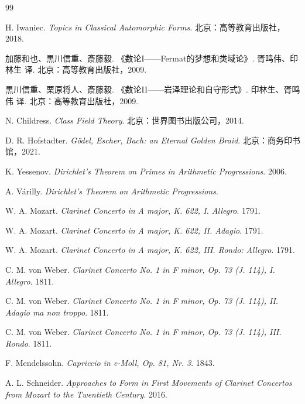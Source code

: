 
\color{black}
\pagecolor{white}
\begin{thebibliography}{99}

H. Iwaniec.
\textit{Topics in Classical Automorphic Forms}.
北京：高等教育出版社，2018.

加藤和也、黒川信重、斎藤毅.
《数论I——Fermat的梦想和类域论》.
胥鸣伟、印林生 译.
北京：高等教育出版社，2009.

黒川信重、栗原将人、斎藤毅.
《数论II——岩泽理论和自守形式》.
印林生、胥鸣伟 译.
北京：高等教育出版社，2009. 

N. Childress.
\textit{Class Field Theory}.
北京：世界图书出版公司，2014.

D. R. Hofstadter.
\textit{Gödel, Escher, Bach: an Eternal Golden Braid}.
北京：商务印书馆，2021.

K. Yessenov.
\textit{Dirichlet's Theorem on Primes in Arithmetic Progressions}.
2006.

A. Várilly.
\textit{Dirichlet's Theorem on Arithmetic Progressions}.

W. A. Mozart.
\textit{Clarinet Concerto in A major, K. 622, I. Allegro}.
1791.

W. A. Mozart.
\textit{Clarinet Concerto in A major, K. 622, II. Adagio}.
1791.

W. A. Mozart.
\textit{Clarinet Concerto in A major, K. 622, III. Rondo: Allegro}.
1791.

C. M. von Weber.
\textit{Clarinet Concerto No. 1 in F minor, Op. 73 (J. 114), I. Allegro}.
1811.

C. M. von Weber.
\textit{Clarinet Concerto No. 1 in F minor, Op. 73 (J. 114), II. Adagio ma non troppo}.
1811.

C. M. von Weber.
\textit{Clarinet Concerto No. 1 in F minor, Op. 73 (J. 114), III. Rondo}.
1811.

F. Mendelssohn.
\textit{Capriccio in e-Moll, Op. 81, Nr. 3}.
1843.

A. L. Schneider.
\textit{Approaches to Form in First Movements of
Clarinet Concertos from Mozart to the Twentieth
Century}.
2016.

\end{thebibliography}

